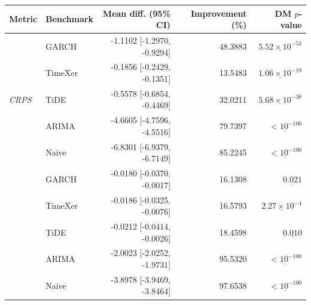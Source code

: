 \begin{tabular}{llrrr}
\toprule
Metric & Benchmark & Mean diff. (95\% CI) & Improvement (\%) & DM $p$-value \\
\midrule
\multirow{5}{*}{\textit{CRPS}}
 & GARCH & -1.1102 [-1.2970, -0.9294] & 48.3883 & $\underline{5.52 \times 10^{-53}}$ \\
 & TimeXer & -0.1856 [-0.2429, -0.1351] & 13.5483 & $\underline{1.06 \times 10^{-19}}$ \\
 & TiDE & -0.5578 [-0.6854, -0.4469] & 32.0211 & $\underline{5.68 \times 10^{-38}}$ \\
 & ARIMA & -4.6605 [-4.7596, -4.5516] & 79.7397 & $\underline{< 10^{-100}}$ \\
 & Naive & -6.8301 [-6.9379, -6.7149] & 85.2245 & $\underline{< 10^{-100}}$ \\
\addlinespace \midrule
\multirow{5}{*}{\textit{twCRPS}}
 & GARCH & -0.0180 [-0.0370, -0.0017] & 16.1308 & $\underline{0.021}$ \\
 & TimeXer & -0.0186 [-0.0325, -0.0076] & 16.5793 & $\underline{2.27 \times 10^{-4}}$ \\
 & TiDE & -0.0212 [-0.0414, -0.0026] & 18.4598 & $\underline{0.010}$ \\
 & ARIMA & -2.0023 [-2.0252, -1.9731] & 95.5320 & $\underline{< 10^{-100}}$ \\
 & Naive & -3.8978 [-3.9469, -3.8464] & 97.6538 & $\underline{< 10^{-100}}$ \\
\bottomrule
\end{tabular}
